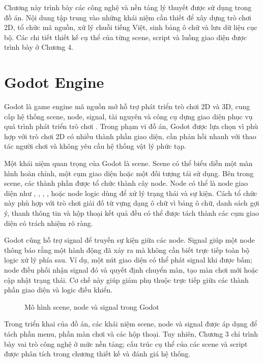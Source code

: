 ﻿\documentclass[../DoAn.tex]{subfiles}
\begin{document}
Chương này trình bày các công nghệ và nền tảng lý thuyết được sử dụng trong đồ án. Nội dung tập trung vào những khái niệm cần thiết để xây dựng trò chơi 2D, tổ chức mã nguồn, xử lý chuỗi tiếng Việt, sinh bảng ô chữ và lưu dữ liệu cục bộ. Các chi tiết thiết kế cụ thể của từng scene, script và luồng giao diện được trình bày ở Chương 4.

\section{Godot Engine}
Godot là game engine mã nguồn mở hỗ trợ phát triển trò chơi 2D và 3D, cung cấp hệ thống scene, node, signal, tài nguyên và công cụ dựng giao diện phục vụ quá trình phát triển trò chơi \cite{godotDocs}. Trong phạm vi đồ án, Godot được lựa chọn vì phù hợp với trò chơi 2D có nhiều thành phần giao diện, cần phản hồi nhanh với thao tác người chơi và không yêu cầu hệ thống vật lý phức tạp.

Một khái niệm quan trọng của Godot là scene. Scene có thể biểu diễn một màn hình hoàn chỉnh, một cụm giao diện hoặc một đối tượng tái sử dụng. Bên trong scene, các thành phần được tổ chức thành cây node. Node có thể là node giao diện như , , , , hoặc node logic dùng để xử lý trạng thái và sự kiện. Cách tổ chức này phù hợp với trò chơi giải đố từ vựng dạng ô chữ vì bảng ô chữ, danh sách gợi ý, thanh thông tin và hộp thoại kết quả đều có thể được tách thành các cụm giao diện có trách nhiệm rõ ràng.

Godot cũng hỗ trợ signal để truyền sự kiện giữa các node. Signal giúp một node thông báo rằng một hành động đã xảy ra mà không cần biết trực tiếp toàn bộ logic xử lý phía sau. Ví dụ, một nút giao diện có thể phát signal khi được bấm; node điều phối nhận signal đó và quyết định chuyển màn, tạo màn chơi mới hoặc cập nhật trạng thái. Cơ chế này giúp giảm phụ thuộc trực tiếp giữa các thành phần giao diện và logic điều khiển.

\begin{figure}[H]
\centering
\resizebox{0.88\textwidth}{!}{}
\caption{Mô hình scene, node và signal trong Godot}
\label{fig:godot-scene-node-signal}
\end{figure}

Trong triển khai của đồ án, các khái niệm scene, node và signal được áp dụng để tách phần menu, phần màn chơi và các hộp thoại. Tuy nhiên, Chương 3 chỉ trình bày vai trò công nghệ ở mức nền tảng; cấu trúc cụ thể của các scene và script được phân tích trong chương thiết kế và đánh giá hệ thống.
\end{document}
